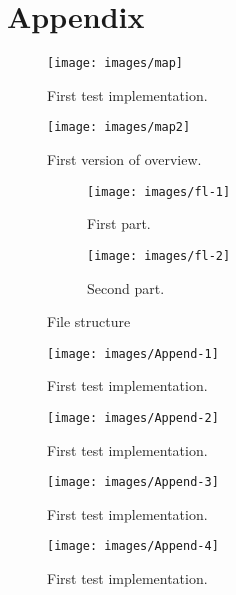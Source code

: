 \documentclass[12pt]{article}
\numberwithin{equation}{section} %
\numberwithin{figure}{section} %
\numberwithin{table}{section} %
\begin{document}
\section{Appendix}	
	\begin{figure}[H]
		\centering		
		\texttt{[image: images/map]}
		\caption{First test implementation.}
		
	\end{figure}
	
	\begin{figure}[H]
		\centering        
		\texttt{[image: images/map2]}
		\caption{First version of overview.}
		\label{fig:map2}
	\end{figure}
	
	\begin{figure}[H]
		\begin{subfigure}[b]{0.25\textwidth}
			\centering
			\texttt{[image: images/fl-1]}
			\caption{First part.}			
		\end{subfigure}
		\begin{subfigure}[b]{0.25\textwidth}
			\centering
			\texttt{[image: images/fl-2]}
			\caption{Second part.}			
		\end{subfigure}
		\caption{File structure}
	\end{figure}

	\begin{figure}[H]
		\centering		
		\texttt{[image: images/Append-1]}
		\caption{First test implementation.}
	\end{figure}
	\begin{figure}[H]
		\centering		
		\texttt{[image: images/Append-2]}
		\caption{First test implementation.}
	\end{figure}
	\begin{figure}[H]
		\centering		
		\texttt{[image: images/Append-3]}
		\caption{First test implementation.}
	\end{figure}
	
	\begin{figure}[H]
		\centering		
		\texttt{[image: images/Append-4]}
		\caption{First test implementation.}
	\end{figure}
\end{document}
